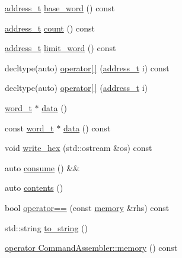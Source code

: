 \begin{DoxyCompactItemize}
\hyperlink{classllk_1_1memory_ae7a4b897aa999f22e250dc8e4d773dec}{address\+\_\+t} \hyperlink{classllk_1_1memory_aa87483dcd1f592e288a4191e435d2ad3}{base\+\_\+word} () const
\item 
\hyperlink{classllk_1_1memory_ae7a4b897aa999f22e250dc8e4d773dec}{address\+\_\+t} \hyperlink{classllk_1_1memory_a5efebebcf80bc1d7f9314ac0e046ee41}{count} () const
\item 
\hyperlink{classllk_1_1memory_ae7a4b897aa999f22e250dc8e4d773dec}{address\+\_\+t} \hyperlink{classllk_1_1memory_a8ed2fac7f82609c47e58bf4774b05b74}{limit\+\_\+word} () const
\item 
decltype(auto) \hyperlink{classllk_1_1memory_a8227a4de6153b8814568474726d02f24}{operator\mbox{[}$\,$\mbox{]}} (\hyperlink{classllk_1_1memory_ae7a4b897aa999f22e250dc8e4d773dec}{address\+\_\+t} i) const
\item 
decltype(auto) \hyperlink{classllk_1_1memory_aefa4c0ffc2836b50f88d3f67c68eb9b6}{operator\mbox{[}$\,$\mbox{]}} (\hyperlink{classllk_1_1memory_ae7a4b897aa999f22e250dc8e4d773dec}{address\+\_\+t} i)
\item 
\hyperlink{classllk_1_1memory_a432a6c0ae1bcb9c44d79cfa1a239419c}{word\+\_\+t} $\ast$ \hyperlink{classllk_1_1memory_a5d840d8417c2cdb37ec1f77ecb0fec6e}{data} ()
\item 
const \hyperlink{classllk_1_1memory_a432a6c0ae1bcb9c44d79cfa1a239419c}{word\+\_\+t} $\ast$ \hyperlink{classllk_1_1memory_aea2feb3e69edfa3968fcc715d7a05238}{data} () const
\item 
void \hyperlink{classllk_1_1memory_a1a8f5221024e8bec67843782a5e511a0}{write\+\_\+hex} (std\+::ostream \&os) const
\item 
auto \hyperlink{classllk_1_1memory_aebeb9c5ccea123bc09ecd2667756af91}{consume} () \&\&
\item 
auto \hyperlink{classllk_1_1memory_abdb3f8fa8d0c1b700dfb02d616b02bd2}{contents} ()
\item 
bool \hyperlink{classllk_1_1memory_a268d76a85a246184d5f1d9bb00b57712}{operator==} (const \hyperlink{classllk_1_1memory}{memory} \&rhs) const
\item 
std\+::string \hyperlink{classllk_1_1memory_aa6e946fd02850a01a1a30f56c28ef530}{to\+\_\+string} ()
\item 
\hyperlink{classllk_1_1memory_a68a9ba98730a540ab25d5c21e9501790}{operator Command\+Assembler\+::memory} () const
\end{DoxyCompactItemize}
